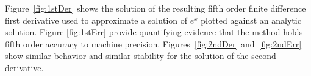 %


Figure~\ref{fig:1stDer} shows the solution of the resulting fifth order finite difference first derivative used to approximate a solution of $e^x$ plotted against an analytic solution.  Figure \ref{fig:1stErr} provide quantifying evidence that the method holds fifth order accuracy to machine precision.  Figures~\ref{fig:2ndDer} and~\ref{fig:2ndErr} show similar behavior and similar stability for the solution of the second derivative. 

